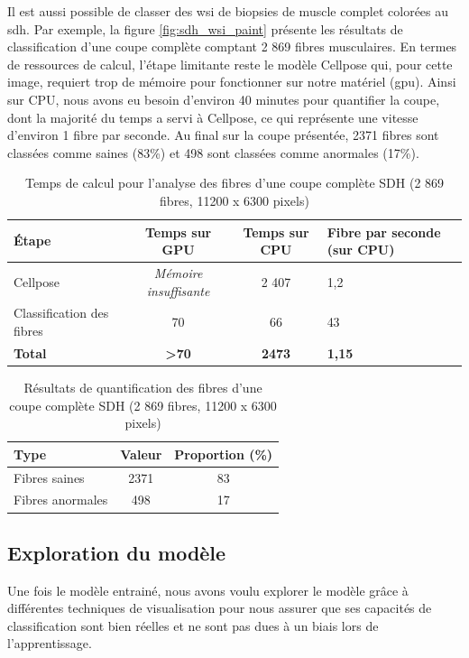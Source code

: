 Il est aussi possible de classer des \gls{wsi} de biopsies de muscle complet colorées au \gls{sdh}. Par exemple, la figure \ref{fig:sdh_wsi_paint} présente les résultats de classification d'une coupe complète comptant 2 869 fibres musculaires. En termes de ressources de calcul, l'étape limitante reste le modèle Cellpose qui, pour cette image, requiert trop de mémoire pour fonctionner sur notre matériel (\gls{gpu}). Ainsi sur CPU, nous avons eu besoin d'environ 40 minutes pour quantifier la coupe, dont la majorité du temps a servi à Cellpose,  ce qui représente une vitesse d'environ 1 fibre par seconde. Au final sur la coupe présentée, 2371 fibres sont classées comme saines (83\%) et 498 sont classées comme anormales (17\%).

\begin{table}[!ht]
\centering
\caption{Temps de calcul pour l'analyse des fibres d'une coupe complète SDH (2 869 fibres, 11200 x 6300 pixels)}
\label{tab:sdh_wsi_timetable}
\begin{tabularx}{\textwidth}{|l|c|c|X|}
\hline
\textbf{Étape} & \textbf{Temps sur GPU} & \textbf{Temps sur CPU} & \textbf{Fibre par seconde (sur CPU)} \\
\hline
Cellpose & \textit{Mémoire insuffisante} & 2 407 & 1,2 \\
\hline
Classification des fibres & 70 & 66 & 43 \\
\hline
\textbf{Total} & \textbf{>70} & \textbf{2473} & \textbf{1,15} \\
\hline
\end{tabularx}
\end{table}
\begin{table}[!ht]
\centering
\caption{Résultats de quantification des  fibres d'une coupe complète SDH (2 869 fibres, 11200 x 6300 pixels)}
\label{tab:sdh_wsi_resultstable}
\begin{tabular}{|l|c|c|}
\hline
\textbf{Type} & \textbf{Valeur} & \textbf{Proportion (\%)} \\
\hline
Fibres saines & 2371 & 83 \\
\hline
Fibres anormales & 498 & 17 \\
\hline
\end{tabular}
\end{table}


\subsection{Exploration du modèle}
Une fois le modèle entrainé, nous avons voulu explorer le modèle grâce à différentes techniques de visualisation pour nous assurer que ses capacités de classification sont bien réelles et ne sont pas dues à un biais lors de l'apprentissage.

